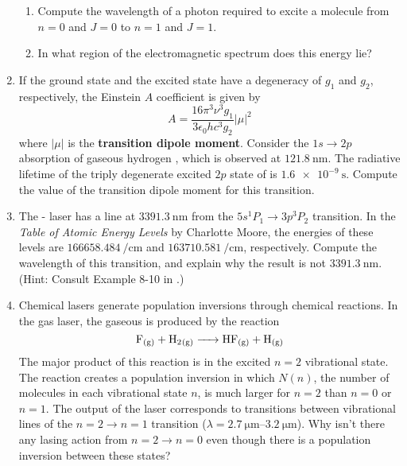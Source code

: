 \documentclass[../psets.tex]{subfiles}
\begin{document}
\begin{enumerate}
\begin{enumerate}
        \item Compute the wavelength of a photon required to excite a molecule from $n=0$ and $J=0$ to $n=1$ and $J=1$.
        \item In what region of the electromagnetic spectrum does this energy lie?
    \end{enumerate}
    \item If the ground state and the excited state have a degeneracy of $g_1$ and $g_2$, respectively, the Einstein $A$ coefficient is given by
    \begin{equation*}
        A = \frac{16\pi^3\nu^3g_1}{3\epsilon_0hc^3g_2}|\mu|^2
    \end{equation*}
    where $|\mu|$ is the \textbf{transition dipole moment}. Consider the $1s\to 2p$ absorption of gaseous hydrogen , which is observed at $\SI{121.8}{\nano\meter}$. The radiative lifetime of the triply degenerate excited $2p$ state of  is $\SI{1.6e-9}{\second}$. Compute the value of the transition dipole moment for this transition.
    \item The - laser has a line at $\SI{3391.3}{\nano\meter}$ from the $5s^1P_1\to 3p^3P_2$ transition. In the \emph{Table of Atomic Energy Levels} by Charlotte Moore, the energies of these levels are $\SI{166658.484}{\per\centi\meter}$ and $\SI{163710.581}{\per\centi\meter}$, respectively. Compute the wavelength of this transition, and explain why the result is not $\SI{3391.3}{\nano\meter}$. (Hint: Consult Example 8-10 in \textcite{bib:McQuarrieSimon}.)
    \item Chemical lasers generate population inversions through chemical reactions. In the  gas laser, the gaseous  is produced by the reaction
    \begin{equation*}
        \ce{F_{(g)} + H2_{(g)} -> HF_{(g)} + H_{(g)}}
    \end{equation*}
    The major product of this reaction is  in the excited $n=2$ vibrational state. The reaction creates a population inversion in which $N(n)$, the number of molecules in each vibrational state $n$, is much larger for $n=2$ than $n=0$ or $n=1$. The output of the  laser corresponds to transitions between vibrational lines of the $n=2\to n=1$ transition ($\lambda=\SIrange{2.7}{3.2}{\micro\meter}$). Why isn't there any lasing action from $n=2\to n=0$ even though there is a population inversion between these states?
\end{enumerate}
\end{document}
